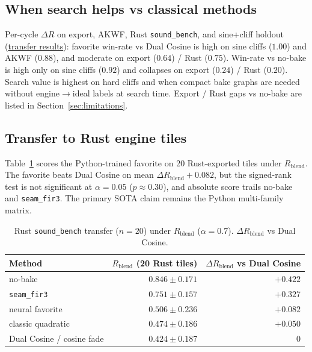 \subsection{When search helps vs classical methods}
\label{sec:transfer}

Per-cycle $\Delta R$ on export, AKWF, Rust \texttt{sound\_bench}, and sine{+}cliff holdout
(\href{https://github.com/reeldemo/denoise-opt-meta/blob/master/paper/Unsupervised_Wavetable_Seam_Artifact_Repair_via_Hybrid_GA-PPO_Meta-Search_v11/figures/transfer_failures.json}{transfer results}):
favorite win-rate vs Dual Cosine is high on sine cliffs ($1.00$) and AKWF ($0.88$), and moderate on export ($0.64$) / Rust ($0.75$).
Win-rate vs no-bake is high only on sine cliffs ($0.92$) and collapses on export ($0.24$) / Rust ($0.20$).
Search value is highest on hard cliffs and when compact bake graphs are needed without engine$\to$ideal labels at search time.
Export / Rust gaps vs no-bake are listed in Section~\ref{sec:limitations}.

\subsection{Transfer to Rust engine tiles}
\label{sec:rust-bench}

Table~\ref{tab:rust-bench} scores the Python-trained favorite on 20 Rust-exported tiles under $R_{\mathrm{blend}}$.
The favorite beats Dual Cosine on mean $\Delta R_{\mathrm{blend}}{+}0.082$, but the signed-rank test is not significant at $\alpha{=}0.05$ ($p{\approx}0.30$),
and absolute score trails no-bake and \texttt{seam\_fir3}.
The primary SOTA claim remains the Python multi-family matrix.

\begin{table}[t]
  \centering
  \caption{Rust \texttt{sound\_bench} transfer ($n{=}20$) under $R_{\mathrm{blend}}$ ($\alpha{=}0.7$).
  $\Delta R_{\mathrm{blend}}$ vs Dual Cosine.}
  \label{tab:rust-bench}
  \setlength{\tabcolsep}{3pt}
  \begin{tabular}{@{}lrr@{}}
    \toprule
    Method & $R_{\mathrm{blend}}$ (20 Rust tiles) & $\Delta R_{\mathrm{blend}}$ vs Dual Cosine \\
    \midrule
    no-bake & $0.846\pm0.171$ & ${+}0.422$ \\
    \texttt{seam\_fir3} & $0.751\pm0.157$ & ${+}0.327$ \\
    neural favorite & $0.506\pm0.236$ & ${+}0.082$ \\
    classic quadratic & $0.474\pm0.186$ & ${+}0.050$ \\
    Dual Cosine / cosine fade & $0.424\pm0.187$ & $0$ \\
    \bottomrule
  \end{tabular}
\end{table}

